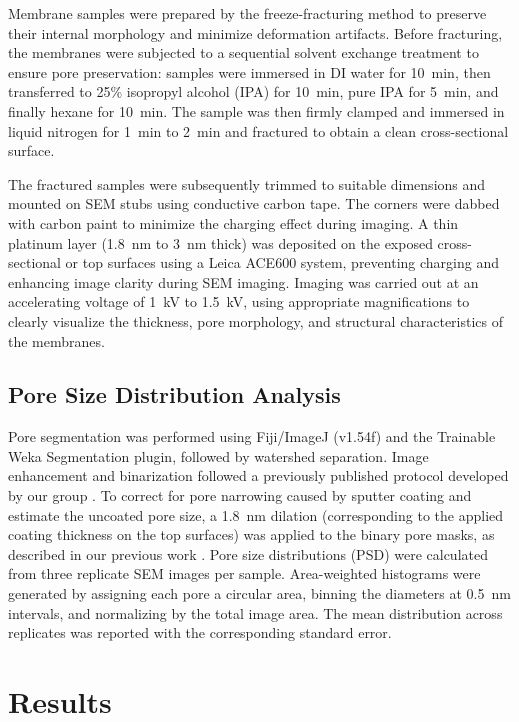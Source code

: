 \documentclass[preprint,12pt,times]{elsarticle}
\begin{document}
Membrane samples were prepared by the freeze-fracturing method to preserve their internal morphology and minimize deformation artifacts. Before fracturing, the membranes were subjected to a sequential solvent exchange treatment to ensure pore preservation: samples were immersed in DI water for 10~min, then transferred to 25\% isopropyl alcohol (IPA) for 10~min, pure IPA for 5~min, and finally hexane for 10~min. The sample was then firmly clamped and immersed in liquid nitrogen for 1~min to 2~min and fractured to obtain a clean cross-sectional surface. 

The fractured samples were subsequently trimmed to suitable dimensions and mounted on SEM stubs using conductive carbon tape. The corners were dabbed with carbon paint to minimize the charging effect during imaging. A thin platinum layer (1.8~nm to 3~nm thick) was deposited on the exposed cross-sectional or top surfaces using a Leica ACE600 system, preventing charging and enhancing image clarity during SEM imaging. Imaging was carried out at an accelerating voltage of 1~kV to 1.5~kV, using appropriate magnifications to clearly visualize the thickness, pore morphology, and structural characteristics of the membranes. 

\subsection{Pore Size Distribution Analysis}
Pore segmentation was performed using Fiji/ImageJ (v1.54f) and the Trainable Weka Segmentation plugin, followed by watershed separation. Image enhancement and binarization followed a previously published protocol developed by our group \cite{SIMA2025}. To correct for pore narrowing caused by sputter coating and estimate the uncoated pore size, a 1.8~nm dilation (corresponding to the applied coating thickness on the top surfaces) was applied to the binary pore masks, as described in our previous work \cite{SIMA2025}. Pore size distributions (PSD) were calculated from three replicate SEM images per sample. Area-weighted histograms were generated by assigning each pore a circular area, binning the diameters at 0.5~nm intervals, and normalizing by the total image area. The mean distribution across replicates was reported with the corresponding standard error.

\section{Results} 
\end{document}
